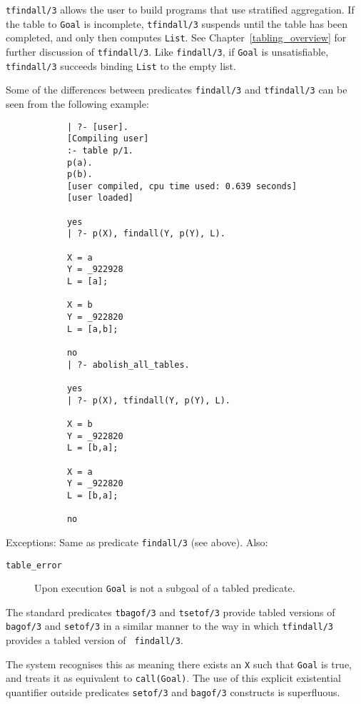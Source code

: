 \begin{description}
    {\tt tfindall/3} allows the user to build programs that use
    stratified aggregation.  If the table to {\tt Goal} is incomplete,
    {\tt tfindall/3} suspends until the table has been completed, and
    only then computes {\tt List}.  See Chapter~\ref{tabling_overview}
    for further discussion of {\tt tfindall/3}.  Like {\tt findall/3},
    if {\tt Goal} is unsatisfiable, {\tt tfindall/3} succeeds binding
    {\tt List} to the empty list.

    Some of the differences between predicates {\tt findall/3} and
    {\tt tfindall/3} can be seen from the following example:

    {\footnotesize
    \begin{verbatim}
            | ?- [user].
            [Compiling user]
            :- table p/1.
            p(a).
            p(b).
            [user compiled, cpu time used: 0.639 seconds]
            [user loaded]

            yes
            | ?- p(X), findall(Y, p(Y), L).

            X = a
            Y = _922928
            L = [a];

            X = b
            Y = _922820
            L = [a,b];

            no
            | ?- abolish_all_tables.

            yes
            | ?- p(X), tfindall(Y, p(Y), L).

            X = b
            Y = _922820
            L = [b,a];

            X = a
            Y = _922820
            L = [b,a];

            no
    \end{verbatim}
    }

    Exceptions: Same as predicate {\tt findall/3} (see above).  Also:
    \begin{description}
    \item[{\tt table\_error}]
	Upon execution {\tt Goal} is not a subgoal of a tabled predicate.
    \end{description}


The standard predicates {\tt tbagof/3} and {\tt tsetof/3} provide
tabled versions of {\tt bagof/3} and {\tt setof/3} in a similar manner
to the way in which {\tt tfindall/3} provides a tabled version of {\tt
findall/3}.

    The system recognises this as meaning there exists an {\tt X} such
    that {\tt Goal} is true, and treats it as equivalent to {\tt call(Goal)}.
    The use of this explicit existential quantifier outside predicates
    {\tt setof/3} and {\tt bagof/3} constructs is superfluous.
\end{description}

